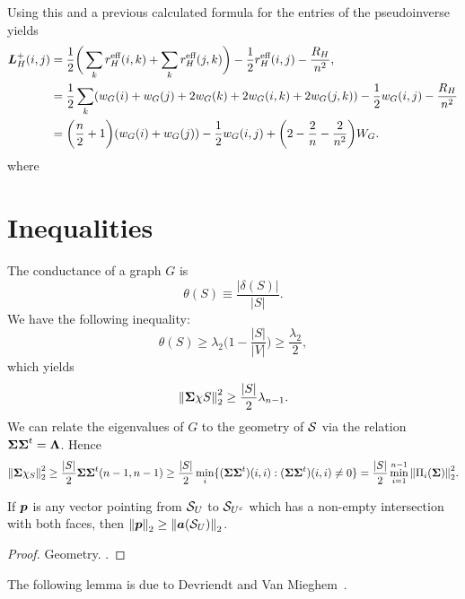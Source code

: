 Using this and a previous calculated formula for the entries of the pseudoinverse yields 
\begin{align*}
\vb*{L}_H^+(i,j) &= \frac{1}{2}\bigg(\sum_k r^{\text{eff}}_H(i,k) + \sum_k r^{\text{eff}}_H(j,k)\bigg) - \frac{1}{2} r^{\text{eff}}_H(i,j) - \frac{R_H}{n^2}, \\
&= \frac{1}{2}\sum_k (w_G(i) + w_G(j) + 2w_G(k) + 2w_G(i,k) + 2w_G(j,k)) - \frac{1}{2}w_G(i,j) - \frac{R_H}{n^2}\\
&= \bigg(\frac{n}{2}+1\bigg)(w_G(i)+w_G(j))  - \frac{1}{2}w_G(i,j) + \bigg(2-\frac{2}{n}-\frac{2}{n^2}\bigg)W_G.
\end{align*}
where


\section{Inequalities}

The conductance of a graph $G$ is 
\begin{equation*}
\theta(S) \equiv \frac{|\delta(S)|}{|S|}. 
\end{equation*}
We have the following inequality: 
\[\theta(S)\geq \lambda_2\bigg(1-\frac{|S|}{|V|}\bigg)\geq \frac{\lambda_2}{2},\]
which yields 
\[\norm{\boldsymbol{\Sigma} \chi S}_2^2 \geq \frac{|S|}{2}\lambda_{n-1}.\]
We can relate the eigenvalues of $G$ to the geometry of $\mathcal{S}$ via the relation $\boldsymbol{\Sigma}\boldsymbol{\Sigma}^t = \vb{\Lambda}$. Hence
\[\norm{\boldsymbol{\Sigma} \chi_S}_2^2 \geq \frac{|S|}{2} \boldsymbol{\Sigma}\boldsymbol{\Sigma}^t (n-1,n-1)\geq \frac{|S|}{2} \min_{i}\{(\boldsymbol{\Sigma}\boldsymbol{\Sigma}^t)(i,i):(\boldsymbol{\Sigma}\boldsymbol{\Sigma}^t)(i,i)\neq 0\} = \frac{|S|}{2}\min_{i=1}^{n-1} \norm{\Pi_i(\boldsymbol{\Sigma})}_2^2.  \]


\begin{lemma}
If $\vb*{p}$ is any vector pointing from $\mathcal{S}_U$ to $\mathcal{S}_{U^c}$ which has a non-empty intersection with both faces, then $\norm{\vb*{p}}_2 \geq \norm{\vb*{a}(\mathcal{S}_U)}_2$. 
\end{lemma}
\begin{proof}
Geometry. . 
\end{proof}

The following lemma is due to Devriendt and Van Mieghem~\cite{devriendt2018simplex}. 


